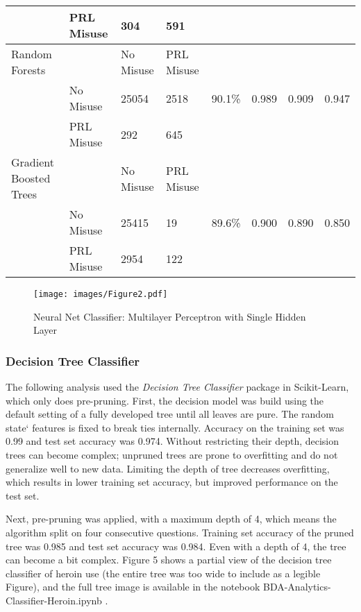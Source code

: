 \documentclass[sigconf]{acmart}
\begin{document}
\begin{table*}[ht]
\begin{tabular}{llllllll}
     & PRL Misuse & 304 & 591 &  &  &  & \\
    \midrule
    Random Forests & & No Misuse & PRL Misuse &  &  &  & \\
     & No Misuse & 25054 & 2518 & 90.1\% & 0.989 & 0.909 & 0.947 \\
     & PRL Misuse & 292 & 645 &  &  &  & \\
    \midrule
    Gradient Boosted Trees & & No Misuse & PRL Misuse &  &  &  & \\
     & No Misuse & 25415 & 19 & 89.6\% & 0.900 & 0.890 & 0.850 \\
     & PRL Misuse & 2954 & 122 &  &  &  & \\
    \bottomrule
  \end{tabular}
\end{table*}


\begin{figure}[!ht]
  \centering\texttt{[image: images/Figure2.pdf]}
  \caption{Neural Net Classifier: Multilayer Perceptron with Single Hidden Layer}
  \label{f:Figure2}
\end{figure}





\subsubsection{Decision Tree Classifier}

The following analysis used the \emph{Decision Tree Classifier} package in 
Scikit-Learn, which only does pre-pruning. First, the decision model was build
using the default setting of a fully developed tree until all leaves are pure. 
The random state` features is fixed to break ties internally. Accuracy on the
training set was 0.99 and test set accuracy was 0.974. Without restricting 
their depth, decision trees can become complex; unpruned trees are prone to 
overfitting and do not generalize well to new data. Limiting the depth of 
tree decreases overfitting, which results in lower training set accuracy, 
but improved performance on the test set. 

Next, pre-pruning was applied, with 
a maximum depth of 4, which means the algorithm split on four consecutive
questions. Training set accuracy of the pruned tree was 0.985 and test set
accuracy was 0.984. Even with a depth of 4, the tree can become a bit complex.
Figure 5 shows a partial view of the decision tree classifier of heroin use 
(the entire tree was too wide to include as a legible Figure), and the full 
tree image is available in the notebook BDA-Analytics-Classifier-Heroin.ipynb 
\cite{classifyH}. 
\end{document}
